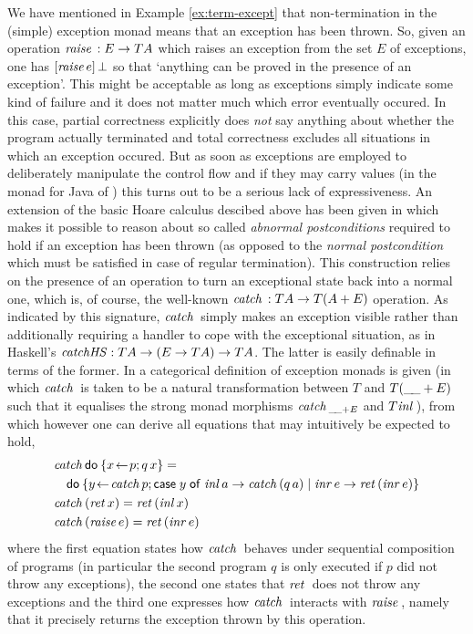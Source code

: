 We have mentioned in Example \ref{ex:term-except} that non-termination
in the (simple) exception monad means that an exception has been
thrown. So, given an operation $\mathit{raise}\, : E \to T A$ which raises an
exception from the set $E$ of exceptions, one has $[\mathit{raise}\,
  e]\,{\bot}$ so that `anything can be proved in the presence of an
exception'. This might be acceptable as long as exceptions simply
indicate some kind of failure and it does not matter much which error
eventually occured.  In this case, partial correctness explicitly does
\emph{not} say anything about whether the program actually terminated
and total correctness excludes all situations in which an exception
occured.  But as soon as exceptions are employed to deliberately
manipulate the control flow and if they may carry values (\EG in the
monad for Java of \cite{JacobsPoll00,HuismanJacobs00}) this turns out
to be a serious lack of expressiveness. An extension of the basic
Hoare calculus descibed above has been given in
\cite{SchroederMossakowski:Java} which makes it possible to reason
about so called \emph{abnormal postconditions} required to hold if an
exception has been thrown (as opposed to the \emph{normal
  postcondition} which must be satisfied in case of regular
termination). This construction relies on the presence of an operation
to turn an exceptional state back into a normal one, which is, of
course, the well-known $\mathit{catch}\, : T A \to T(A + E)$ operation. As
indicated by this signature, $\mathit{catch}\,$ simply makes an exception
visible rather than additionally requiring a handler to cope with the
exceptional situation, as in Haskell's $\mathit{catchHS} : T A \to (E \to T A)
\to T A$. The latter is easily definable in terms of the former.  In
\cite{SchroederMossakowski:Java} a categorical definition of exception
monads is given (in which $\mathit{catch}\,$ is taken to be a natural
transformation between $T$ and $T(\_\!\_ + E)$ such that it equalises
the strong monad morphisms $\mathit{catch}\,_{\_\!\_ + E}$ and $T\mathit{inl}\,$), from
which however one can derive all equations that may intuitively be
expected to hold, \EG
\begin{equation}
  \label{eq:except-eqns}
  \begin{split}
    & \mathit{catch}\, \mathsf{do}\: \{x\!\gets\! p; q\,x\} = \\
    & \quad\mathsf{do}\: \{y\!\gets\! \mathit{catch}\, p; \mathsf{case}\; y\;\mathsf{of}\; \mathit{inl}\, a \to \mathit{catch}\, (q\,a) \;|\; \mathit{inr}\, e \to
    \mathit{ret\,}(\mathit{inr}\, e)\}\\
    & \mathit{catch}\, (\mathit{ret\,} x) = \mathit{ret\,} (\mathit{inl}\, x) \\
    & \mathit{catch}\, (\mathit{raise}\, e) = \mathit{ret\,} (\mathit{inr}\, e)
  \end{split}
\end{equation}
where the first equation states how $\mathit{catch}\,$ behaves under sequential
composition of programs (in particular the second program $q$ is only executed
if $p$ did not throw any exceptions), the second one states that $\mathit{ret\,}$ does not
throw any exceptions and the third one expresses how $\mathit{catch}\,$ interacts with
$\mathit{raise}\,$, namely that it precisely returns the exception thrown by this
operation. 

